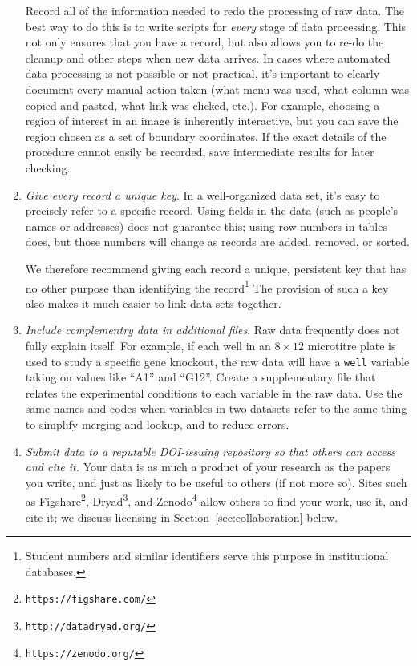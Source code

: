 \documentclass[10pt]{article}
\newcommand{\recommend}[1]{\textit{#1}}
\newcommand{\withurl}[2]{{#1}\footnote{\texttt{#2}}}
\begin{document}
\begin{enumerate}
  Record all of the information needed to redo the processing of raw data. 
  The best way to do this is to write scripts for
  \emph{every} stage of data processing.
  This not only ensures that you have a record, but also allows you to
  re-do the cleanup and other steps when new data arrives. 
  In cases where automated data processing is not possible
  or not practical, it's important to
  clearly document every manual action taken (what menu was used, what
  column was copied and pasted, what link was clicked, etc.). For example, 
  choosing a region of interest in an image
  is inherently interactive, but you can save the region chosen 
  as a set of boundary coordinates. If the
  exact details of the procedure cannot easily be recorded,
  save intermediate results for later checking. 

\item
  \recommend{Give every record a unique key}.  In a well-organized
  data set, it's easy to precisely refer to a specific record.
  Using fields in the data (such as people's names or addresses) does
  not guarantee this; using row numbers in tables does, but those
  numbers will change as records are added, removed, or sorted.

  We therefore recommend giving each record a unique, persistent key
  that has no other purpose than identifying the
  record\footnote{Student numbers and similar identifiers serve this
    purpose in institutional databases.} The provision of such a key
  also makes it much easier to link data sets together.

\item
  \recommend{Include complementry data in additional files}.  Raw data 
  frequently does not fully explain
  itself. For example, if each well in an $8{\times}12$ microtitre
  plate is used to study a specific gene knockout, the raw
  data will have a \texttt{well} variable taking on values like ``A1''
  and ``G12''. Create a supplementary file that relates the experimental
  conditions to each variable in the raw data. Use the 
  same names and codes when variables in two
  datasets refer to the same thing to simplify merging and lookup, and 
  to reduce errors.

\item
  \recommend{Submit data to a reputable DOI-issuing repository so that
    others can access and cite it.}  Your data is as much a product of
  your research as the papers you write, and just as likely to be
  useful to others (if not more so).  Sites such as
  \withurl{Figshare}{https://figshare.com/},
  \withurl{Dryad}{http://datadryad.org/}, and
  \withurl{Zenodo}{https://zenodo.org/} allow others to find your work, 
  use it, and cite it; we discuss licensing in
  Section~\ref{sec:collaboration} below.

\end{enumerate}
\end{document}
